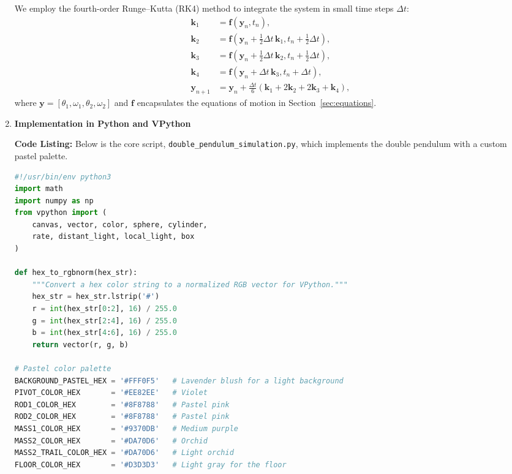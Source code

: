 \documentclass[letterpaper,12pt]{article}
\begin{document}
\begin{enumerate}[leftmargin=*, itemsep=1em]
We employ the fourth-order Runge–Kutta (RK4) method to integrate the system in small time steps $\Delta t$:
\[
\begin{aligned}
\mathbf{k}_1 &= \mathbf{f}(\mathbf{y}_n, t_n), \\
\mathbf{k}_2 &= \mathbf{f}(\mathbf{y}_n + \tfrac{1}{2}\Delta t\,\mathbf{k}_1, t_n + \tfrac{1}{2}\Delta t), \\
\mathbf{k}_3 &= \mathbf{f}(\mathbf{y}_n + \tfrac{1}{2}\Delta t\,\mathbf{k}_2, t_n + \tfrac{1}{2}\Delta t), \\
\mathbf{k}_4 &= \mathbf{f}(\mathbf{y}_n + \Delta t\,\mathbf{k}_3, t_n + \Delta t), \\
\mathbf{y}_{n+1} &= \mathbf{y}_n + \frac{\Delta t}{6}(\mathbf{k}_1 + 2\mathbf{k}_2 + 2\mathbf{k}_3 + \mathbf{k}_4),
\end{aligned}
\]
where $\mathbf{y} = [\theta_1, \omega_1, \theta_2, \omega_2]$ and $\mathbf{f}$ encapsulates the equations of motion in Section~\ref{sec:equations}.

\item \textbf{Implementation in Python and VPython}
\label{sec:implementation}

\textbf{Code Listing:} Below is the core script,
\texttt{double\_pendulum\_simulation.py},
which implements the double pendulum with a custom pastel palette.

\begin{lstlisting}[language=Python, caption=Double Pendulum Simulation with Pastel Palette, label=lst:doublependulum]
#!/usr/bin/env python3
import math
import numpy as np
from vpython import (
    canvas, vector, color, sphere, cylinder,
    rate, distant_light, local_light, box
)

def hex_to_rgbnorm(hex_str):
    """Convert a hex color string to a normalized RGB vector for VPython."""
    hex_str = hex_str.lstrip('#')
    r = int(hex_str[0:2], 16) / 255.0
    g = int(hex_str[2:4], 16) / 255.0
    b = int(hex_str[4:6], 16) / 255.0
    return vector(r, g, b)

# Pastel color palette
BACKGROUND_PASTEL_HEX = '#FFF0F5'   # Lavender blush for a light background
PIVOT_COLOR_HEX       = '#EE82EE'   # Violet
ROD1_COLOR_HEX        = '#8F8788'   # Pastel pink
ROD2_COLOR_HEX        = '#8F8788'   # Pastel pink
MASS1_COLOR_HEX       = '#9370DB'   # Medium purple
MASS2_COLOR_HEX       = '#DA70D6'   # Orchid
MASS2_TRAIL_COLOR_HEX = '#DA70D6'   # Light orchid
FLOOR_COLOR_HEX       = '#D3D3D3'   # Light gray for the floor


\end{lstlisting}
\end{enumerate}
\end{document}

